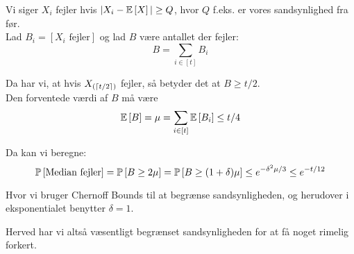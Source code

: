 Vi siger $X_i$ fejler hvis $|X_i - \E{X}| \geq Q$, hvor $Q$ f.eks. er vores sandsynlighed fra før.\\
Lad $B_i = [X_i \text{ fejler}]$ og lad $B$ være antallet der fejler:
$$
B = \sum_{i \in [t]} B_i
$$


Da har vi, at hvis $X_{(\ceil{t/2})}$ fejler, så betyder det at $B \geq t/2$.\\
Den forventede værdi af $B$ må være
$$
\E{B} = \mu = \sum_{i \in [t]} \E{B_i} \leq t/4
$$

Da kan vi beregne:
$$
\P{\text{Median fejler}}
= \P{B \geq 2 \mu}
= \P{B \geq (1 + \delta) \mu }
\leq e^{- \delta^2 \mu / 3}
\leq e^{-t/12}
$$

Hvor vi bruger Chernoff Bounds til at begrænse sandsynligheden, og herudover i eksponentialet benytter $\delta = 1$.



Herved har vi altså væsentligt begrænset sandsynligheden for at få noget rimelig forkert.



